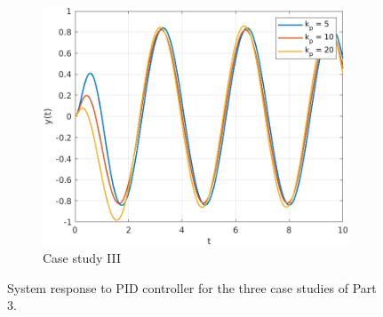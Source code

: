 \documentclass{article}
\begin{document}
\begin{figure}[H]
\begin{subfigure}{0.325\textwidth}
        \includegraphics[width = \textwidth]{figures/part_3_kd.png}
        \caption{Case study III}
    \end{subfigure}
    \caption{System response to PID controller for the three case studies of Part 3.}
    \label{fig:part-3_results}
\end{figure}
\end{document}

